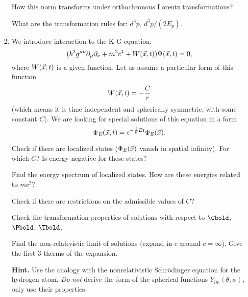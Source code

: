 \documentclass[a4paper,11pt]{article}
\begin{document}
\begin{enumerate}
  How this norm transforms under orthochronous Lorentz
  transformations?

  What are the transformation rules for: $d^{ 3 } p$,
  $d^{ 3 } p / ( 2 E_{ p } )$.

\item We introduce interaction to the K-G equation:
  \begin{equation}
    \label{eq:12}
    ( \hbar^{ 2 } g^{ \mu \nu } \partial_{ \mu } \partial_{ \nu } + m^{ 2 } c^{ 4 } + W( \vec{ x }, t ) )
    \Psi( \vec{ x }, t )
    = 0,
  \end{equation}
  where $W( \vec{ x }, t )$ is a given function. Let us assume a
  particular form of this function
  \begin{equation}
    \label{eq:13}
    W( \vec{ x }, t ) = -\frac{ C }{ r }
  \end{equation}
  (which means it is time independent and spherically symmetric, with
  some constant $C$). We are looking for special solutions of this
  equation in a form
  \begin{equation}
    \label{eq:14}
    \Psi_{ E }( \vec{ x }, t ) = e^{ -\frac{ i }{ \hbar } E t } \Phi_{ E }( \vec{ x } ).
  \end{equation}

  Check if there are localized states ($\Phi_{ E }( \vec{ x } )$ vanish in
  spatial infinity). For which $C$? Is energy negative for these
  states?

  Find the energy spectrum of localized states. How are these energies
  related to $m c^{ 2 }$?

  Check if there are restrictions on the admissible values of $C$?

  Check the transformation properties of solutions with respect to
  $\Cbold$, $\Pbold$, $\Tbold$.

  Find the non-relativistic limit of solutions (expand in $c$ around
  $c = \infty$). Give the first 3 therms of the expansion.

  \textbf{Hint.} Use the analogy with the nonrelativistic
  Schr\"{o}dinger equation for the hydrogen atom. \textit{Do not}
  derive the form of the spherical functions
  $Y_{ l m }( \theta, \phi )$, only use their properties.


\end{enumerate}
\end{document}
